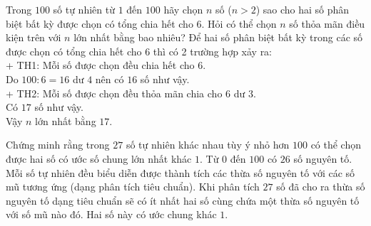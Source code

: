 \begin{bt}%
	Trong $ 100 $ số tự nhiên từ $ 1 $ đến $100 $ hãy chọn $ n $ số ($n>2  $) sao cho hai số phân biệt bất kỳ được chọn có tổng chia hết cho $ 6 $. Hỏi có thể chọn $ n $ số thỏa mãn điều kiện trên với $ n $ lớn nhất bằng bao nhiêu?
	\loigiai
	{ Để hai số phân biệt bất kỳ trong các số được chọn có tổng chia hết cho $ 6 $ thì có 2 trường hợp xảy ra:
		\\+ TH1: Mỗi số được chọn đều chia hết cho $ 6 $.
		\\ Do $ 100:6=16 $ dư $ 4 $ nên có $ 16  $ số như vậy.
		\\ + TH2:  Mỗi số được chọn đều thỏa mãn chia cho $ 6 $ dư $ 3 $.
		\\ Có $ 17 $ số như vậy.
		\\ Vậy $ n $ lớn nhất bằng $ 17 $.
	}
\end{bt}






\begin{bt}%
	Chứng minh rằng trong $ 27$ số tự nhiên khác nhau tùy ý nhỏ hơn $100$ có thể chọn được hai số có ước số chung lớn nhất  khác $1$.
	\loigiai
	{Từ $0$ đến $100$ có $26$ số nguyên tố. Mỗi số tự nhiên đều biểu diễn được thành tích các thừa số nguyên tố với các số mũ tương ứng (dạng phân tích tiêu chuẩn).
		Khi phân tích $27$ số đã cho ra thừa số nguyên tố dạng tiêu chuẩn sẽ có ít nhất hai số cùng chứa một thừa số nguyên tố với số mũ nào đó. Hai số này có ước chung khác $1$.
	}
\end{bt}

